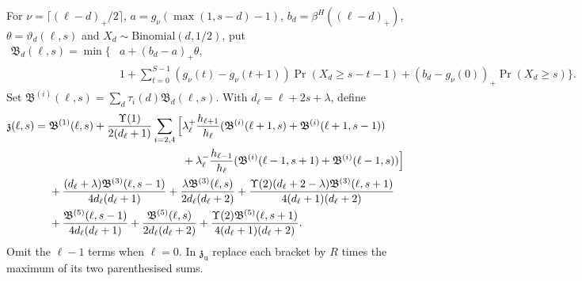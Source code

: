 For $\nu=\lceil(\ell-d)_+/2\rceil$, $a=g_\nu(\max(1,s-d)-1)$, $b_d=\beta^H((\ell-d)_+)$, $\theta=\vartheta_d(\ell,s)$ and $X_d\sim\mathrm{Binomial}(d,1/2)$, put
\begin{align*}
\mathfrak B_d(\ell,s)=\min\Big\{&a+(b_d-a)_+\theta,\\
&1+\sum_{t=0}^{S-1}(g_\nu(t)-g_\nu(t+1))\Pr(X_d\geq s-t-1)
 +(b_d-g_\nu(0))_+\Pr(X_d\geq s)\Big\}.
\end{align*}
Set $\mathfrak B^{(i)}(\ell,s)=\sum_d\tau_i(d)\mathfrak B_d(\ell,s)$. With $d_\ell=\ell+2s+\lambda$, define
\begin{align*}
\mathfrak z(\ell,s)={}&\mathfrak B^{(1)}(\ell,s)
+\frac{\Upsilon(1)}{2(d_\ell+1)}\sum_{i=2,4}\Big[\lambda^+_\ell\frac{h_{\ell+1}}{h_\ell}
 (\mathfrak B^{(i)}(\ell+1,s)+\mathfrak B^{(i)}(\ell+1,s-1))\\
&\hphantom{\mathfrak B^{(1)}(\ell,s)+\frac{\Upsilon(1)}{2(d_\ell+1)}\sum_{i=2,4}\Big[}
+\lambda^-_\ell\frac{h_{\ell-1}}{h_\ell}(\mathfrak B^{(i)}(\ell-1,s+1)+\mathfrak B^{(i)}(\ell-1,s))\Big]\\
&+\frac{(d_\ell+\lambda)\mathfrak B^{(3)}(\ell,s-1)}{4d_\ell(d_\ell+1)}
+\frac{\lambda\mathfrak B^{(3)}(\ell,s)}{2d_\ell(d_\ell+2)}
+\frac{\Upsilon(2)(d_\ell+2-\lambda)\mathfrak B^{(3)}(\ell,s+1)}{4(d_\ell+1)(d_\ell+2)}\\
&+\frac{\mathfrak B^{(5)}(\ell,s-1)}{4d_\ell(d_\ell+1)}
+\frac{\mathfrak B^{(5)}(\ell,s)}{2d_\ell(d_\ell+2)}
+\frac{\Upsilon(2)\mathfrak B^{(5)}(\ell,s+1)}{4(d_\ell+1)(d_\ell+2)}.
\end{align*}
Omit the $\ell-1$ terms when $\ell=0$. In $\mathfrak z_{\mathrm u}$ replace each bracket by $R$ times the maximum of its two parenthesised sums.

